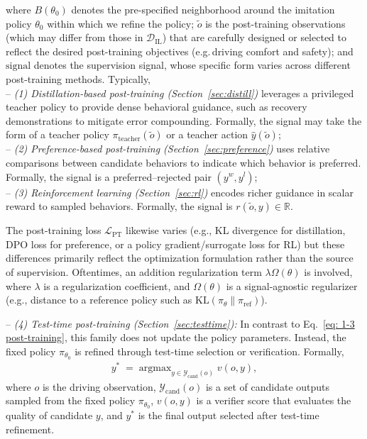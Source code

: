 \documentclass[runningheads]{llncs}
\begin{document}
\noindent where $B(\theta_0)$ denotes the pre-specified neighborhood around the imitation policy $\theta_0$ within which we refine the policy;  
$\tilde{o}$ is the post-training observations (which may differ from those in $\mathcal{D}_{\text{IL}}$) that are carefully designed or selected to reflect the desired post-training objectives (e.g.\,driving comfort and safety);  
and $\text{signal}$ denotes the supervision signal, whose specific form varies across different post-training methods. 
    Typically, \\
    -- \textit{(1) Distillation-based post-training (Section~\ref{sec:distill})} leverages a privileged teacher policy to provide dense behavioral guidance, such as recovery demonstrations to mitigate error compounding. Formally, the signal may take the form of a teacher policy $\pi_{\text{teacher}}(\tilde{o})$ or a teacher action $\hat{y}(\tilde{o})$;  \\
    --  \textit{(2) Preference-based post-training (Section~\ref{sec:preference})} uses relative comparisons between candidate behaviors to indicate which behavior is preferred. Formally, the signal is a preferred--rejected pair $(y^w, y^l)$;   \\     
    -- \textit{(3) Reinforcement learning (Section~\ref{sec:rl})} encodes richer guidance in scalar reward to sampled behaviors. Formally, the signal is $r(\tilde{o},y)\in \mathbb{R}$. 

    \vspace{0.3em} 
    
    \noindent The post-training loss $\mathcal{L}_{\text{PT}}$ likewise varies (e.g., KL divergence for distillation, DPO loss for preference, or a policy gradient/surrogate loss for RL) but these differences primarily reflect the optimization formulation rather than the source of supervision. Oftentimes, an addition regularization term $\lambda \Omega(\theta)$ is involved, where $\lambda$ is a regularization coefficient,
    and $\Omega(\theta)$ is a signal‑agnostic regularizer (e.g., distance to a reference policy such as $\text{KL}(\pi_\theta \| \pi_{\text{ref}})$). 


\vspace{0.5em}
\noindent  -- \textit{(4) Test-time post-training (Section~\ref{sec:testtime}):} In contrast to Eq.~\eqref{eq: 1-3 post-training}, this family does not update the policy parameters. Instead, the fixed policy $\pi_{\theta_0}$ is refined through test-time selection or verification. Formally,  
\begin{align}
\label{eq:test_time_selection}
    y^* \;=\; \text{argmax}_{y \in \mathcal{Y}_{\text{cand}}(o)} \; v(o,y),
\end{align}
where $o$ is the driving observation, $\mathcal{Y}_{\text{cand}}(o)$ is a set of candidate outputs sampled from the fixed policy $\pi_{\theta_0}$, $v(o,y)$ is a verifier score that evaluates the quality of candidate $y$, and $y^*$ is the final output selected after test-time refinement.
\end{document}
